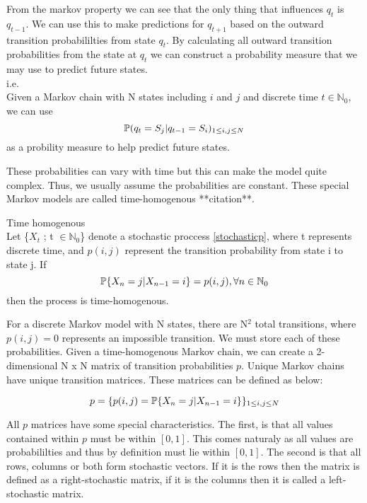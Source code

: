 From the markov property we can see that the only thing that influences $q_t$ is $q_{t-1}$. We can use this to make predictions for $q_{t+1}$ based on the outward transition probabililties from state $q_t$. By calculating all outward transition probabilities from the state at $q_t$ we can construct a probability measure that we may use to predict future states.
\\
i.e. 
\\
Given a Markov chain with N states including $i$ and $j$ and discrete time $t \in \mathbb{N}_0$, we can use 
\begin{equation}
	\label{probmeas}
	\mathbb{P} (q_t = S_j | q_{t-1} = S_i)_{1 \leq i,j \leq N}
\end{equation}
as a probility measure to help predict future states.

These probabilities can vary with time but this can make the model quite complex. Thus, we usually assume the probabilities are constant. These special Markov models are called time-homogenous **citation**. 

\begin{definition}
\label{timehomogenous}
	Time homogenous \\
	Let \{$X_t$ ; t $\in \mathbb{N}_0$\} denote a stochastic proccess \ref{stochasticp}, where t represents discrete time, and $p(i,j)$ represent the transition probability from state i to state j. If 
	\begin{equation}
		\mathbb{P} \{X_n = j | X_{n-1} = i\} = p(i,j),       \forall n \in \mathbb{N}_0
	\end{equation}
	then the process is time-homogenous.
\end{definition}

For a discrete Markov model with N states, there are N$^2$ total transitions, where $p(i,j) = 0$ represents an impossible transition. We must store each of these probabilities. Given a time-homogenous Markov chain, we can create a 2-dimensional N x N matrix of transition probabilities $p$. Unique Markov chains have unique transition matrices. These matrices can be defined as below:

\begin{equation}
	\label{pmat}
	p = \{ p(i,j) = \mathbb{P} \{ X_n = j | X_{n-1} = i \}\}_{1 \leq i,j \leq N}
\end{equation}

All $p$ matrices have some special characteristics. The first, is that all values contained within $p$ must be within $[0,1]$. This comes naturaly as all values are probabililties and thus by definition must lie within $[0,1]$. The second is that all rows, columns or both form stochastic vectors. If it is the rows then the matrix is defined as a right-stochastic matrix, if it is the columns then it is called a left-stochastic matrix.\\

